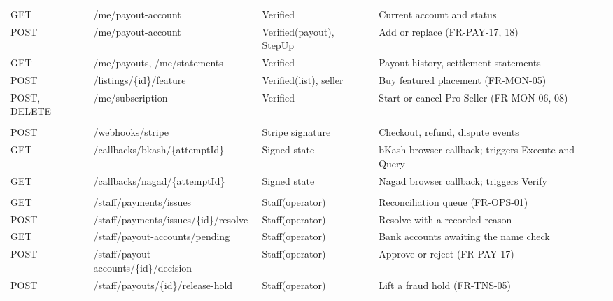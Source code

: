 \documentclass[11pt,a4paper]{article}
\begin{document}
{\begin{longtable}{@{}>{\ttfamily\raggedright\arraybackslash}p{1.15cm}>{\ttfamily\raggedright\arraybackslash}p{4.9cm}>{\raggedright\arraybackslash}p{2.7cm}>{\raggedright\arraybackslash}p{6.2cm}@{}}
GET & /\allowbreak me/\allowbreak payout-\allowbreak account & Verified & Current account and status \\
POST & /\allowbreak me/\allowbreak payout-\allowbreak account & Verified(payout), StepUp & Add or replace (FR-PAY-17, 18) \\
GET & /\allowbreak me/\allowbreak payouts, /\allowbreak me/\allowbreak statements & Verified & Payout history, settlement statements \\
POST & /\allowbreak listings/\allowbreak \{id\}/\allowbreak feature & Verified(list), seller & Buy featured placement (FR-MON-05) \\
POST, DELETE & /\allowbreak me/\allowbreak subscription & Verified & Start or cancel Pro Seller (FR-MON-06, 08) \\
\multicolumn{4}{@{}l}{\textbf{Providers} (no session; verified per Section~\ref{sec:verify})} \\
POST & /\allowbreak webhooks/\allowbreak stripe & Stripe signature & Checkout, refund, dispute events \\
GET & /\allowbreak callbacks/\allowbreak bkash/\allowbreak \{attemptId\} & Signed state & bKash browser callback; triggers Execute and Query \\
GET & /\allowbreak callbacks/\allowbreak nagad/\allowbreak \{attemptId\} & Signed state & Nagad browser callback; triggers Verify \\
\multicolumn{4}{@{}l}{\textbf{Staff}} \\
GET & /\allowbreak staff/\allowbreak payments/\allowbreak issues & Staff(operator) & Reconciliation queue (FR-OPS-01) \\
POST & /\allowbreak staff/\allowbreak payments/\allowbreak issues/\allowbreak \{id\}/\allowbreak resolve & Staff(operator) & Resolve with a recorded reason \\
GET & /\allowbreak staff/\allowbreak payout-\allowbreak accounts/\allowbreak pending & Staff(operator) & Bank accounts awaiting the name check \\
POST & /\allowbreak staff/\allowbreak payout-\allowbreak accounts/\allowbreak \{id\}/\allowbreak decision & Staff(operator) & Approve or reject (FR-PAY-17) \\
POST & /\allowbreak staff/\allowbreak payouts/\allowbreak \{id\}/\allowbreak release-\allowbreak hold & Staff(operator) & Lift a fraud hold (FR-TNS-05) \\
\bottomrule
\end{longtable}
}
\end{document}
